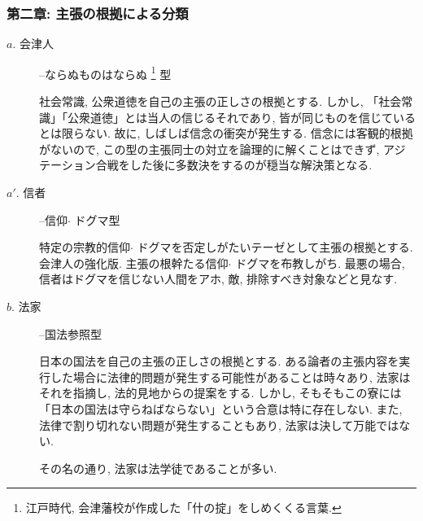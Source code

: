 \documentclass[10pt,b5jsbook,dvips,dvipdfmx,openany]{jsbook}
\theoremstyle{definition}
\begin{document}
			\subsubsection{第二章: 主張の根拠による分類}

			\begin{description}

			\item[$a$. 会津人]--ならぬものはならぬ \footnote{江戸時代, 会津藩校が作成した「什の掟」をしめくくる言葉. } 型

			社会常識, 公衆道徳を自己の主張の正しさの根拠とする. しかし, 「社会常識」「公衆道徳」とは当人の信じるそれであり, 皆が同じものを信じているとは限らない. 故に, しばしば信念の衝突が発生する. 信念には客観的根拠がないので, この型の主張同士の対立を論理的に解くことはできず, アジテーション合戦をした後に多数決をするのが穏当な解決策となる. 


			\item[$a'$. 信者]--信仰$ \cdot $ ドグマ型

			特定の宗教的信仰$ \cdot $ ドグマを否定しがたいテーゼとして主張の根拠とする. 会津人の強化版. 主張の根幹たる信仰$ \cdot $ ドグマを布教しがち. 最悪の場合, 信者はドグマを信じない人間をアホ, 敵, 排除すべき対象などと見なす. 


			\item[$b$. 法家]--国法参照型

			日本の国法を自己の主張の正しさの根拠とする. ある論者の主張内容を実行した場合に法律的問題が発生する可能性があることは時々あり, 法家はそれを指摘し, 法的見地からの提案をする. しかし, そもそもこの寮には「日本の国法は守らねばならない」という合意は特に存在しない. また, 法律で割り切れない問題が発生することもあり, 法家は決して万能ではない. 

			その名の通り, 法家は法学徒であることが多い. 
			\end{description}
\end{document}
